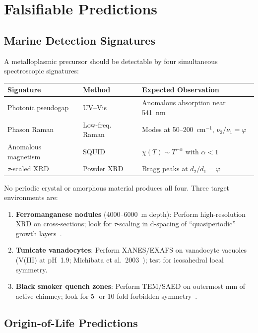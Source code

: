 \documentclass[12pt]{article}
\theoremstyle{principia}
\theoremstyle{definition}
\theoremstyle{remark}
\providecommand{\vp}{\varphi}
\begin{document}
\section{Falsifiable Predictions}\label{sec:predictions}

\subsection{Marine Detection Signatures}

A metalloplasmic precursor should be detectable by four simultaneous spectroscopic signatures:

\begin{center}
\begin{tabular}{@{}llp{5.5cm}@{}}
\toprule
\textbf{Signature} & \textbf{Method} & \textbf{Expected Observation} \\
\midrule
Photonic pseudogap & UV--Vis & Anomalous absorption near 541~nm \\
Phason Raman & Low-freq. Raman & Modes at 50--200~cm$^{-1}$, $\nu_2/\nu_1 = \vp$ \\
Anomalous magnetism & SQUID & $\chi(T) \sim T^{-\alpha}$ with $\alpha < 1$ \\
$\tau$-scaled XRD & Powder XRD & Bragg peaks at $d_2/d_1 = \vp$ \\
\bottomrule
\end{tabular}
\end{center}

\noindent No periodic crystal or amorphous material produces all four. Three target environments are:
\begin{enumerate}[noitemsep]
    \item \textbf{Ferromanganese nodules} (4000--6000~m depth): Perform high-resolution XRD on cross-sections; look for $\tau$-scaling in d-spacing of ``quasiperiodic'' growth layers~\cite{Hein00}.
    \item \textbf{Tunicate vanadocytes}: Perform XANES/EXAFS on vanadocyte vacuoles (V(III) at pH~1.9; Michibata et al.\ 2003~\cite{Michibata03}); test for icosahedral local symmetry.
    \item \textbf{Black smoker quench zones}: Perform TEM/SAED on outermost mm of active chimney; look for 5- or 10-fold forbidden symmetry~\cite{BindiSteinhardt09}.
\end{enumerate}

\subsection{Origin-of-Life Predictions}
\end{document}
